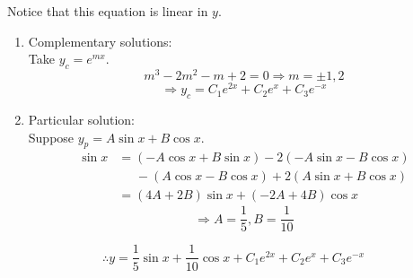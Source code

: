 \item

Notice that this equation is linear in $y$.
\begin{enumerate}[wide, labelindent = 0pt, label = (\roman*)]
	\item Complementary solutions:\\
	      Take $y_c = e^{mx}$.
	      \[
		      m^3 - 2m^2 - m + 2 = 0
		      \Rightarrow m = \pm 1, 2
	      \]
	      \[
		      \Rightarrow y_c = C_1 e^{2x} + C_2 e^x + C_3 e^{-x}
	      \]

	\item Particular solution:\\
	      Suppose $y_p = A\sin x + B\cos x$.
	      \begin{align*}
		      \sin x
		       & = (-A\cos x + B\sin x) - 2(-A\sin x - B\cos x)         \\
		       & \;\;\;\;\;- (A\cos x - B\cos x) + 2(A\sin x + B\cos x) \\
		       & = (4A + 2B)\sin x + (-2A + 4B)\cos x
	      \end{align*}
	      \[
		      \Rightarrow A = \frac{1}{5}, B = \frac{1}{10}
	      \]
\end{enumerate}
\[
	\therefore y = \frac{1}{5}\sin x + \frac{1}{10}\cos x + C_1 e^{2x} + C_2 e^x + C_3 e^{-x}
\]